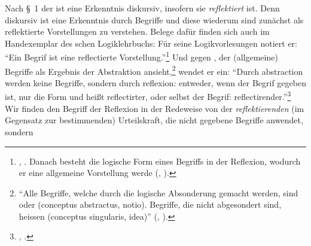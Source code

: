 Nach \S~1 der {\jaeschelogik} ist eine Erkenntnis diskursiv, insofern
sie \emph{reflektiert} ist. Denn diskursiv ist eine Erkenntnis durch Begriffe
und diese wiederum sind zunächst als reflektierte Vorstellungen zu verstehen.
Belege dafür finden sich auch im Handexemplar des
schen
Logiklehrbuchs: Für seine Logikvorlesungen notiert er: \enquote{Ein
  Begrif ist eine reflectierte 
Vorstellung.}\footnote{\cite[][]{Kant:Reflexionen1900ff.},
\cite[][XVI: 536.2]{Kant:GesammelteWerke1900ff.}. Danach besteht die logische
Form eines Begriffs in der Reflexion, wodurch er eine allgemeine Vorstellung
werde \mkbibparens{\cite[vgl.][]{Kant:Reflexionen1900ff.},
\cite[][XVI: 546.14--16]{Kant:GesammelteWerke1900ff.}}.} Und gegen
, der (allgemeine) Begriffe als
Ergebnis der Abstraktion ansieht,\footnote{\enquote{Alle Begriffe, welche
durch die logische Absonderung gemacht werden, sind  oder
 (conceptus abstractus, notio). Begriffe, die nicht
abgesondert sind, heissen  (conceptus singularis, idea)}
\mkbibparens{\cite[][\S~260]{Meier:AuszugausderVernunftlehre1752},
\cite[][XVI: 551.25--28]{Kant:GesammelteWerke1900ff.}}.} wendet er ein:
\enquote{Durch abstraction werden keine Begriffe, sondern durch reflexion:
entweder, wenn der Begrif gegeben ist, nur die Form und heißt reflectirter, oder
selbst der Begrif: reflectirender.}\footnote{\cite[][]{Kant:Reflexionen1900ff.},
\cite[][XVI: 552.9--11]{Kant:GesammelteWerke1900ff.}.} Wir finden den Begriff
der Reflexion in der Redeweise von der \emph{reflektierenden} (im Gegensatz zur
bestimmenden) Urteilskraft, die nicht gegebene Begriffe anwendet, sondern
